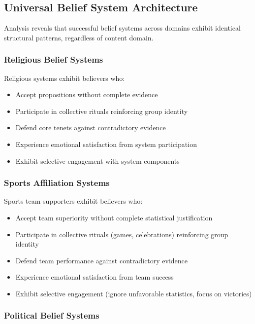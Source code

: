 \documentclass[12pt,a4paper]{article}
\begin{document}
\subsection{Universal Belief System Architecture}

Analysis reveals that successful belief systems across domains exhibit identical structural patterns, regardless of content domain.

\subsubsection{Religious Belief Systems}

Religious systems exhibit believers who:
\begin{itemize}
\item Accept propositions without complete evidence
\item Participate in collective rituals reinforcing group identity
\item Defend core tenets against contradictory evidence
\item Experience emotional satisfaction from system participation
\item Exhibit selective engagement with system components
\end{itemize}

\subsubsection{Sports Affiliation Systems}

Sports team supporters exhibit believers who:
\begin{itemize}
\item Accept team superiority without complete statistical justification
\item Participate in collective rituals (games, celebrations) reinforcing group identity  
\item Defend team performance against contradictory evidence
\item Experience emotional satisfaction from team success
\item Exhibit selective engagement (ignore unfavorable statistics, focus on victories)
\end{itemize}

\subsubsection{Political Belief Systems}
\end{document}
